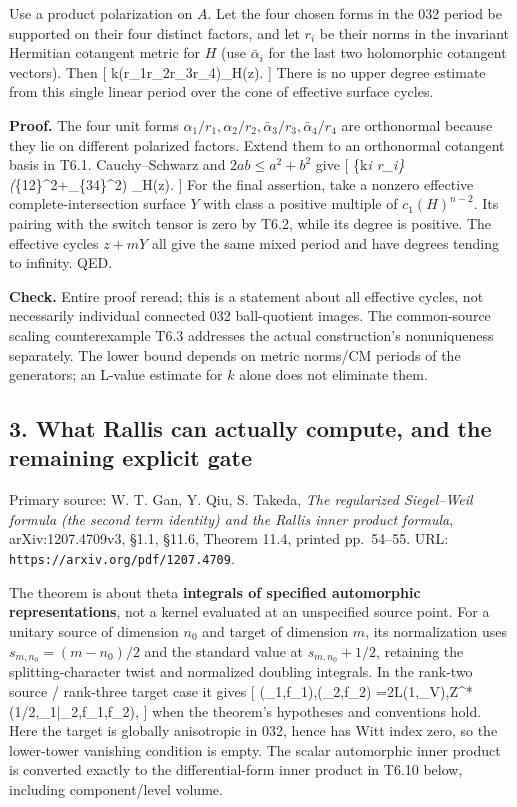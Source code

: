 \documentclass[11pt,a4paper]{article}
\theoremstyle{definition}
\begin{document}
Use a product polarization on \(A\). Let the four chosen forms in the
032 period be supported on their four distinct factors, and let \(r_i\)
be their norms in the invariant Hermitian cotangent metric for \(H\)
(use \(\bar\alpha_i\) for the last two holomorphic cotangent vectors).
Then {[} \textbar k\textbar{}\le (r\_1r\_2r\_3r\_4)\deg\_H(z). 
{]} There is no upper degree estimate from this single linear period
over the cone of effective surface cycles.

\textbf{Proof.} The four unit forms
\(\alpha_1/r_1,\alpha_2/r_2,\bar\alpha_3/r_3,\bar\alpha_4/r_4\) are
orthonormal because they lie on different polarized factors. Extend them
to an orthonormal cotangent basis in T6.1. Cauchy--Schwarz and
\(2ab\le a^2+b^2\) give {[} \{\textbar k\textbar{}\over\prod\emph{i
r\_i\}(\textbar{}\xi}\{12\}\textbar\^{}2+\textbar{}\xi\_\{34\}\textbar\^{}2)
\le\deg\_H(z). {]} For the final assertion, take a nonzero effective
complete-intersection surface \(Y\) with class a positive multiple of
\(c_1(H)^{n-2}\). Its pairing with the switch tensor is zero by T6.2,
while its degree is positive. The effective cycles \(z+mY\) all give the
same mixed period and have degrees tending to infinity. QED.

\textbf{Check.} Entire proof reread; this is a statement about all
effective cycles, not necessarily individual connected 032 ball-quotient
images. The common-source scaling counterexample T6.3 addresses the
actual construction's nonuniqueness separately. The lower bound depends
on metric norms/CM periods of the generators; an L-value estimate for
\(k\) alone does not eliminate them.

\subsection{3. What Rallis can actually compute, and the remaining
explicit
gate}\label{what-rallis-can-actually-compute-and-the-remaining-explicit-gate}

Primary source: W. T. Gan, Y. Qiu, S. Takeda, \emph{The regularized
Siegel--Weil formula (the second term identity) and the Rallis inner
product formula}, arXiv:1207.4709v3, §1.1, §11.6, Theorem 11.4, printed
pp.~54--55. URL: \texttt{https://arxiv.org/pdf/1207.4709}.

The theorem is about theta \textbf{integrals of specified automorphic
representations}, not a kernel evaluated at an unspecified source point.
For a unitary source of dimension \(n_0\) and target of dimension \(m\),
its normalization uses \(s_{m,n_0}=(m-n_0)/2\) and the standard value at
\(s_{m,n_0}+1/2\), retaining the splitting-character twist and
normalized doubling integrals. In the rank-two source / rank-three
target case it gives {[}
\langle\theta(\phi\_1,f\_1),\theta(\phi\_2,f\_2)\rangle
=2L(1,\pi\times\chi\_V),Z\^{}*(1/2,\phi\_1\otimes\bar\phi\_2,f\_1,f\_2),
 {]} when the theorem's hypotheses and conventions hold. Here
the target is globally anisotropic in 032, hence has Witt index zero, so
the lower-tower vanishing condition is empty. The scalar automorphic
inner product is converted exactly to the differential-form inner
product in T6.10 below, including component/level volume.
\end{document}
